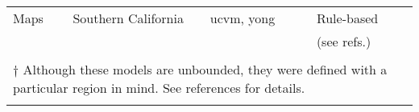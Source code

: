 \begin{table*}[ht!]
\begin{tabular}[]{llllll}
\vsthirty{} Maps   & Southern California   & ucvm, yong    &              & Rule-based         & \citet{Wills_2006_BSSA}      \\
                   &                       &               &              & (see refs.)        & \citet{Wald_2007_BSSA}       \\
                   &                       &               &              &                    & \citet{Yong_2012_BSSA}       \\
\hline
\multicolumn{6}{l}{$\dagger$ \footnotesize Although these models are unbounded, they were defined with a particular region in mind. See references for details.}\\
\\
\end{tabular}
\label{tab:cvms}
\end{table*}


